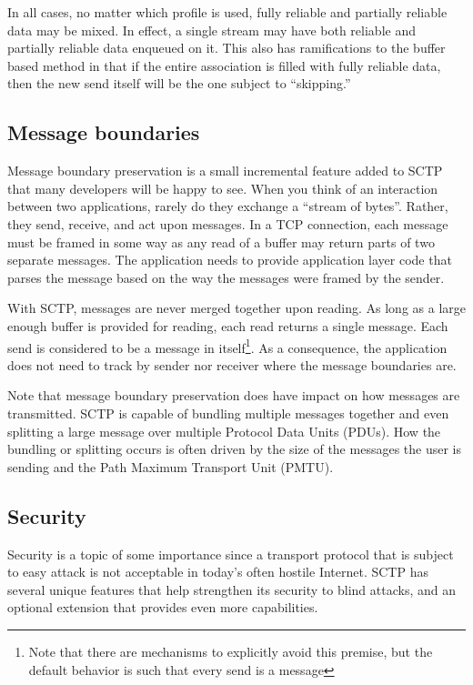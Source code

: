 \documentclass[conference]{IEEEtran}
\begin{document}
In all cases, no matter which profile is used, fully reliable and partially reliable
data may be mixed. In effect, a single stream may have both reliable and
partially reliable data enqueued on it. This also has ramifications to the 
buffer based method in that if the entire association is filled with 
fully reliable data, then the new send itself will be the one subject
to ``skipping.''

\subsection{Message boundaries}
\label{mbound}
Message boundary preservation is a small incremental feature added to
SCTP that many developers will be happy to see. When you think of
an interaction between two applications, rarely do they exchange a ``stream of bytes''.
Rather, they send, receive, and act upon messages. In a TCP connection, each
message must be framed in some way as any read of a buffer may return
parts of two separate messages. The application needs to provide application
layer code that parses the message based on the way the messages
were framed by the sender. 

With SCTP, messages are never merged together upon reading. As long
as a large enough buffer is provided for reading, each read returns a 
single message. Each send is considered to be a message in itself\footnote{Note that
there are mechanisms to explicitly avoid this premise, but the default behavior is such
that every send is a message}. As a consequence, the application does not need to
track by sender nor receiver where the message boundaries are.

Note that message boundary preservation does have impact on how
messages are transmitted. SCTP is capable of bundling multiple messages
together and even splitting a large message over multiple Protocol Data Units (PDUs).
How the bundling or splitting occurs is often driven by the size of the 
messages the user is sending and the Path Maximum Transport Unit (PMTU).


\subsection{Security}
\label{secure}

Security is a topic of  some importance since a transport protocol that is subject
to easy attack is not acceptable in today's often hostile Internet. SCTP has several
unique features that help strengthen its security to blind attacks, and an optional
extension \cite{rfc4895} that provides even more capabilities.
\end{document}
